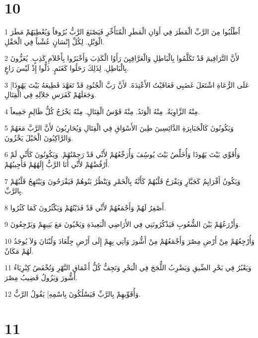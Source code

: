 \chapter{10}

\par 1 اُطْلُبُوا مِنَ الرَّبِّ الْمَطَرَ فِي أَوَانِ الْمَطَرِ الْمُتَأَخِّرِ فَيَصْنَعَ الرَّبُّ بُرُوقاً وَيُعْطِيَهُمْ مَطَرَ الْوَبْلِ. لِكُلِّ إِنْسَانٍ عُشْباً فِي الْحَقْلِ.
\par 2 لأَنَّ التَّرَافِيمَ قَدْ تَكَلَّمُوا بِالْبَاطِلِ وَالْعَرَّافِيِنَ رَأَوُا الْكَذِبَ وَأَخْبَرُوا بِأَحْلاَمِ كَذِبٍ. يُعَزُّونَ بِالْبَاطِلِ. لِذَلِكَ رَحَلُوا كَغَنَمٍ. ذَلُّوا إِذْ لَيْسَ رَاعٍ.
\par 3 [عَلَى الرُّعَاةِ اشْتَعَلَ غَضَبِي فَعَاقَبْتُ الأَعْتِدَةَ. لأَنَّ رَبَّ الْجُنُودِ قَدْ تَعَهَّدَ قَطِيعَهُ بَيْتَ يَهُوذَا وَجَعَلَهُمْ كَفَرَسِ جَلاَلِهِ فِي الْقِتَالِ.
\par 4 مِنْهُ الزَّاوِيَةُ. مِنْهُ الْوَتَدُ. مِنْهُ قَوْسُ الْقِتَالِ. مِنْهُ يَخْرُجُ كُلُّ ظَالِمٍ جَمِيعاً.
\par 5 وَيَكُونُونَ كَالْجَبَابِرَةِ الدَّائِسِينَ طِينَ الأَسْوَاقِ فِي الْقِتَالِ وَيُحَارِبُونَ لأَنَّ الرَّبَّ مَعَهُمْ وَالرَّاكِبُونَ الْخَيْلَ يَخْزُونَ.
\par 6 وَأُقَوِّي بَيْتَ يَهُوذَا وَأُخَلِّصُ بَيْتَ يُوسُِفَ وَأُرَجِّعُهُمْ لأَنِّي قَدْ رَحِمْتُهُمْ. وَيَكُونُونَ كَأَنِّي لَمْ أَرْفُضْهُمْ لأَنِّي أَنَا الرَّبُّ إِلَهُهُمْ فَأُجِيبُهُمْ.
\par 7 وَيَكُونُ أَفْرَايِمُ كَجَبَّارٍ وَيَفْرَحُ قَلْبُهُمْ كَأَنَّهُ بِالْخَمْرِ وَيَنْظُرُ بَنُوهُمْ فَيَفْرَحُونَ وَيَبْتَهِجُ قَلْبُهُمْ بِالرَّبِّ.
\par 8 أَصْفِرُ لَهُمْ وَأَجْمَعُهُمْ لأَنِّي قَدْ فَدَيْتُهُمْ وَيَكْثُرُونَ كَمَا كَثُرُوا.
\par 9 وَأَزْرَعُهُمْ بَيْنَ الشُّعُوبِ فَيَذْكُرُونَنِي فِي الأَرَاضِي الْبَعِيدَةِ وَيَحْيُونَ مَعَ بَنِيهِمْ وَيَرْجِعُونَ.
\par 10 وَأُرْجِعُهُمْ مِنْ أَرْضِ مِصْرَ وَأَجْمَعُهُمْ مِنْ أَشُّورَ وَآتِي بِهِمْ إِلَى أَرْضِ جِلْعَادَ وَلُبْنَانَ وَلاَ يُوجَدُ لَهُمْ مَكَانٌ.
\par 11 وَيَعْبُرُ فِي بَحْرِ الضِّيقِ وَيَضْرِبُ اللُّجَجَ فِي الْبَحْرِ وَتَجِفُّ كُلُّ أَعْمَاقِ النَّهْرِ وَتُخْفَضُ كِبْرِيَاءُ أَشُّورَ وَيَزُولُ قَضِيبُ مِصْرَ.
\par 12 وَأُقَوِّيهِمْ بِالرَّبِّ فَيَسْلُكُونَ بِاسْمِهِ] يَقُولُ الرَّبُّ.

\chapter{11}

